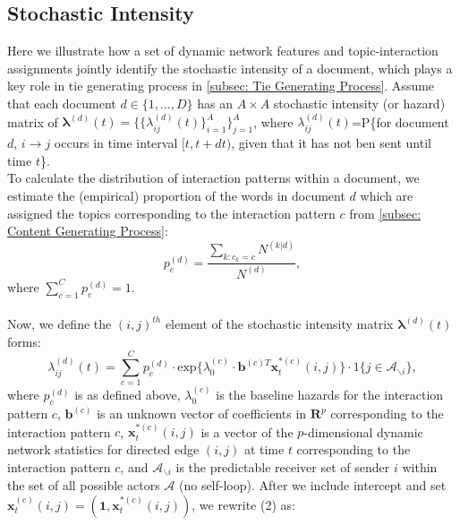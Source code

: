 \documentclass[a4paper]{article}
\begin{document}
\subsection{Stochastic Intensity} \label{subsec: Stochastic Intensity}
Here we illustrate how a set of dynamic network features and topic-interaction assignments  jointly identify the stochastic intensity of a document, which plays a key role in tie generating process in \ref{subsec: Tie Generating Process}. Assume that each document $d \in \{1,...,D\}$ has an $A\times A$ stochastic intensity (or hazard) matrix of $\boldsymbol{\lambda}^{(d)}(t) = \{\{\lambda^{(d)}_{ij}(t)\}_{i=1}^{A}\}_{j=1}^{A}$, where $\lambda^{(d)}_{ij}(t)$=P\{for document $d$, $i\rightarrow j$ occurs in time interval $[t, t+dt)$, given that it has not ben sent until time $t$\}. \\ \newline
To calculate the distribution of interaction patterns within a document, we estimate the (empirical) proportion of the words in document $d$ which are assigned the topics corresponding to the interaction pattern $c$ from \ref{subsec: Content Generating Process}: 
\begin{equation}
p_c^{(d)} = \frac{\sum\limits_{k: c_k=c} N^{(k|d)}}{N^{(d)}},
\end{equation}
where $\sum\limits_{c=1}^{C}p_c^{(d)}=1$.\\\\ \newline
Now, we define the $(i, j)^{th}$ element of the stochastic intensity matrix $\boldsymbol{\lambda}^{(d)}(t)$ forms:
\begin{equation}
\lambda^{(d)}_{ij}(t)=\sum\limits_{c=1}^{C} p^{(d)}_c
\cdot  \mbox{exp}\Big\{\lambda^{(c)}_0\cdot \boldsymbol{b}^{(c)T}\boldsymbol{x}^{*(c)}_t(i, j)\Big\}\cdot 1\{j \in \mathcal{A}_{\backslash i}\},
\end{equation}
where $p_c^{(d)}$ is as defined above, $\lambda^{(c)}_0$ is the baseline hazards for the interaction pattern $c$, $\boldsymbol{b}^{(c)}$ is an unknown vector of coefficients in $\boldsymbol{R}^{p}$ corresponding to the interaction pattern $c$, $\boldsymbol{x}^{*(c)}_t(i, j)$ is a vector of the $p$-dimensional dynamic network statistics for directed edge $(i, j)$ at time $t$ corresponding to the interaction pattern $c$, and $\mathcal{A}_{\backslash i}$ is the predictable receiver set of sender $i$ within the set of all possible actors $\mathcal{A}$ (no self-loop). After we include intercept and set $\boldsymbol{x}^{(c)}_t(i, j)=(\boldsymbol{1}, \boldsymbol{x}^{*(c)}_t(i, j))$, we rewrite (2) as: 
\end{document}
